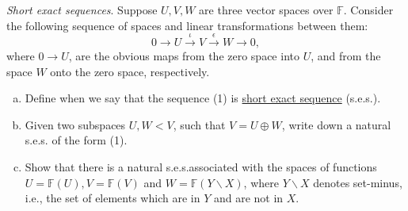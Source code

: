 \documentclass{article}
\begin{document}
\begin{problem}
    \textit{Short exact sequences}. Suppose $U,V,W$ are three vector spaces over $\mathbb{F}$. Consider the following sequence of spaces and linear transformations between them:
    \begin{equation}
        0 \xrightarrow{} U \xrightarrow{\iota} V \xrightarrow{\epsilon} W \xrightarrow{} 0,
    \end{equation}
    where $0 \to U$, are the obvious maps from the zero space into $U$, and from the space $W$ onto the zero space, respectively. \\
    \begin{enumerate}[a)]
        \item Define when we say that the sequence (1) is \underline{short exact sequence} (s.e.s.).
        \item Given two subspaces $U,W < V$, such that $V = U \oplus W$, write down a natural s.e.s. of the form (1).
        \item Show that there is a natural s.e.s.associated with the spaces of functions $U = \mathbb{F}(U), V = \mathbb{F}(V)$ and $W = \mathbb{F}(Y \backslash X)$, where $Y \backslash X$ denotes set-minus, i.e., the set of elements which are in $Y$ and are not in $X$.
    \end{enumerate}
\end{problem}
\end{document}
